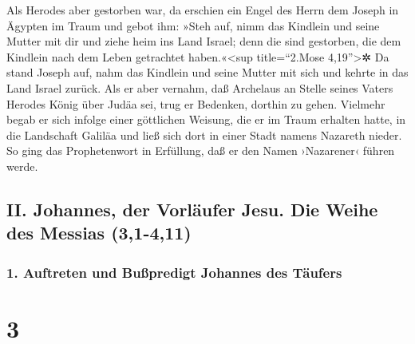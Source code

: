  Als Herodes aber gestorben war, da erschien ein Engel
des Herrn dem Joseph in Ägypten im Traum  und gebot ihm:
»Steh auf, nimm das Kindlein und seine Mutter mit dir und ziehe heim ins
Land Israel; denn die sind gestorben, die dem Kindlein nach dem Leben
getrachtet haben.«\textless sup title=``2.Mose 4,19''\textgreater✲
 Da stand Joseph auf, nahm das Kindlein und seine Mutter
mit sich und kehrte in das Land Israel zurück.  Als er
aber vernahm, daß Archelaus an Stelle seines Vaters Herodes König über
Judäa sei, trug er Bedenken, dorthin zu gehen. Vielmehr begab er sich
infolge einer göttlichen Weisung, die er im Traum erhalten hatte, in die
Landschaft Galiläa  und ließ sich dort in einer Stadt
namens Nazareth nieder. So ging das Prophetenwort in Erfüllung, daß er
den Namen ›Nazarener‹ führen werde.

\hypertarget{ii.-johannes-der-vorluxe4ufer-jesu.-die-weihe-des-messias-31-411}{%
\subsection{II. Johannes, der Vorläufer Jesu. Die Weihe des Messias
(3,1-4,11)}\label{ii.-johannes-der-vorluxe4ufer-jesu.-die-weihe-des-messias-31-411}}

\hypertarget{auftreten-und-buuxdfpredigt-johannes-des-tuxe4ufers}{%
\subsubsection{1. Auftreten und Bußpredigt Johannes des
Täufers}\label{auftreten-und-buuxdfpredigt-johannes-des-tuxe4ufers}}

\hypertarget{section-2}{%
\section{3}\label{section-2}}

